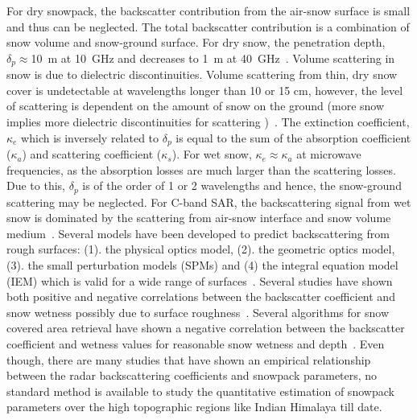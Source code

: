 For dry snowpack, the backscatter contribution from the air-snow surface is small and thus can be neglected. The total backscatter contribution is a combination of snow volume and snow-ground surface. For dry snow, the penetration depth, $\delta_p\approx$10~m at 10~GHz and decreases to 1~m at 40~GHz~\citep{Rott85}. Volume scattering in snow is due to dielectric discontinuities. Volume scattering from thin, dry snow cover is undetectable at wavelengths longer than 10 or 15 cm, however, the level of scattering is dependent on the amount of snow on the ground (more snow implies more dielectric discontinuities for scattering )~\citep{bernier1987microwave}. The extinction coefficient, $\kappa_e$ which is inversely related to $\delta_p$ is equal to the sum of the absorption coefficient ($\kappa_{a}$) and scattering coefficient ($\kappa_{s}$). For wet snow, $\kappa_{e}\approx\kappa_{a}$ at microwave frequencies, as the absorption losses are much larger than the scattering losses. Due to this, $\delta_p$ is of the order of 1 or 2 wavelengths and hence, the snow-ground scattering may be neglected. For C-band SAR, the backscattering signal from wet snow is dominated by the scattering from air-snow interface and snow volume medium~\citep{Shi95wetness}. Several models have been developed to predict backscattering from rough surfaces: (1). the physical optics model, (2). the geometric optics model, (3). the small perturbation models (SPMs) and (4) the integral equation model (IEM) which is valid for a wide range of surfaces~\citep{Fung92,fung1994microwave}. Several studies have shown both positive and negative correlations between the backscatter coefficient and snow wetness possibly due to surface roughness~\citep{stiles1980dielectric,shi1992radar}. Several algorithms for snow covered area retrieval have shown a negative correlation between the backscatter coefficient and wetness values for reasonable snow wetness and depth~\citep{Koskinen97,Nagler2000,Guneriussen2001b}. Even though, there are many studies that have shown an empirical relationship between the radar backscattering coefficients and snowpack parameters, no standard method is available to study the quantitative estimation of snowpack parameters over the high topographic regions like Indian Himalaya till date.   

